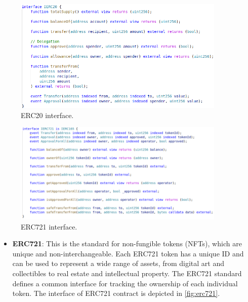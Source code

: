 \begin{figure}[t]
	\begin{center}
		\includegraphics[width=0.9\textwidth]{./figs/ERC20.png }
		\caption{ERC20 interface.}		
		\label{fig:erc20}
	\end{center}	
\end{figure}
\begin{figure}
	\begin{center}
		\includegraphics[width=0.9\textwidth]{./figs/ERC721.png }
		\caption{ERC721 interface.}		
		\label{fig:erc721}
	\end{center}	
\end{figure}


\begin{itemize}
	\tightlist
	\item
	\textbf{ERC721}: This is the standard for non-fungible tokens (NFTs),
	which are unique and non-interchangeable. Each ERC721 token has a
	unique ID and can be used to represent a wide range of assets, from
	digital art and collectibles to real estate and intellectual property.
	The ERC721 standard defines a common interface for tracking the
	ownership of each individual token.
	The interface of ERC721 contract is depicted in \autoref{fig:erc721}.
\end{itemize}




